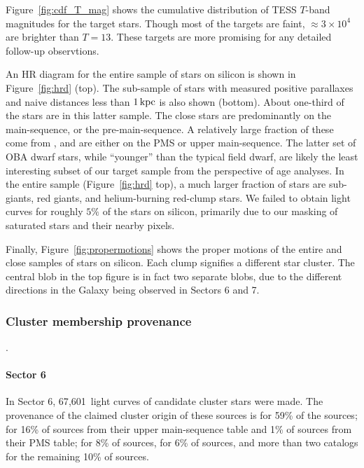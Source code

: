 \documentclass[12pt,twocolumn,tighten]{aastex62}
\newcommand{\sVInumberlcs}{67{,}601\ }  %
\begin{document}


Figure~\ref{fig:cdf_T_mag} shows the cumulative distribution of
TESS $T$-band magnitudes for the target stars.
Though most of the targets are faint, $\approx3\times10^4$ are
brighter than $T=13$. These targets are more promising for any
detailed follow-up observtions.

An HR diagram for the entire sample of stars on silicon
is shown in Figure~\ref{fig:hrd} (top).
The sub-sample of stars with
measured positive parallaxes and naive distances less than
$1\,{\rm kpc}$ is also shown (bottom).
About one-third of the stars are in this latter sample.
The close stars are predominantly on the main-sequence, or the pre-main-sequence.
A relatively large fraction of these come from \citet{zari_3d_2018},
and are either on the PMS or upper main-sequence.
The latter set of OBA dwarf stars, while ``younger'' than the typical
field dwarf, are likely the least interesting subset of our target sample
from the perspective of age analyses.
In the entire sample (Figure~\ref{fig:hrd} top), a much larger fraction of stars are sub-giants,
red giants, and helium-burning red-clump stars.
We failed to obtain light curves for roughly $5\%$ of the stars on silicon, 
primarily due to our masking of saturated stars and their nearby pixels.

Finally, 
Figure~\ref{fig:propermotions} shows the proper motions
of the entire and close samples of stars on silicon.
Each clump signifies a different star cluster. The central
blob in the top figure is in fact two separate blobs,
due to the different directions in the Galaxy being observed
in Sectors 6 and 7.



\subsubsection{Cluster membership provenance}.

\paragraph{Sector 6}
In Sector 6, \sVInumberlcs light curves of candidate cluster stars
were made. The provenance of the claimed cluster origin of these
sources is \citet{dias_proper_2014} for 59\% of the sources;
\citet{zari_3d_2018} for 16\% of sources from their upper
main-sequence table and 1\% of sources from their PMS table;
\citet{Kharchenko_et_al_2013} for 8\% of sources,
\citet{cantat-gaudin_gaia_2018} for 6\% of sources, and more than two
catalogs for the remaining 10\% of sources.
\end{document}
